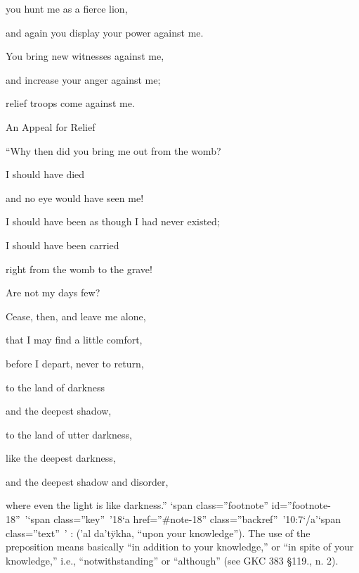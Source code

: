 {\par }{\Q you hunt
me as a fierce lion,
\par }{\Q and again
you display your power against me.
\par }{\Q {}You bring new
witnesses
against me,
\par }{\Q and increase
your anger
against me;
\par }{\Q relief troops come
against
me.
\par }{\SH An Appeal for Relief
\par }{\Q {}“Why
then did you bring me out
from the womb?
\par }{\Q I should have died
\par }{\Q and no
eye
would have seen me!
\par }{\Q {}I should
have
been
as though
I had never existed;
\par }{\Q I should
have been carried
\par }{\Q right from the womb
to the grave!
\par }{\Q {}Are not
my days
few?

\par }{\Q Cease,
then, and leave me alone,
\par }{\Q that I may find a little
comfort,
\par }{\Q {}before
I depart,
never
to return,
\par }{\Q to
the land
of darkness
\par }{\Q and the deepest shadow,
\par }{\Q {}to the land
of utter darkness,
\par }{\Q like
the deepest darkness,
\par }{\Q and the deepest shadow
and disorder,
\par }{\Q where even the light
is like
darkness.” ‘span class=”footnote” id=”footnote-18” ’‘span class=”key” ’18‘a href=”\#note-18” class=”backref” ’10:7‘/a’‘span class=”text” ’
{}:
{}
{} (’al da’tÿkha, “upon your knowledge”). The use of the preposition means basically “in addition to your knowledge,” or “in spite of your knowledge,” i.e., “notwithstanding” or “although” (see GKC 383 §119.{}, n. 2).

}
